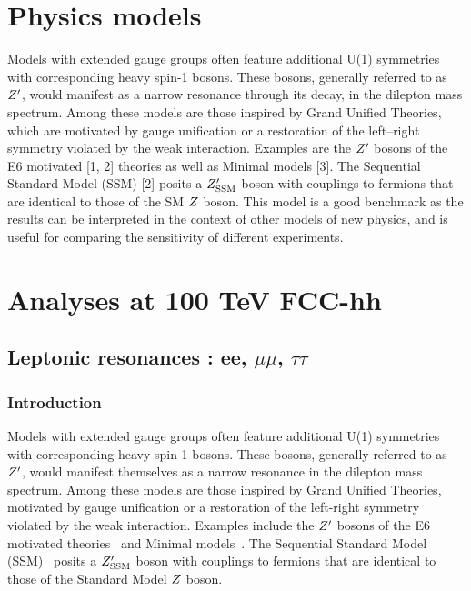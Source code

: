 \documentclass{cernrep}
\begin{document}
\section{Physics models}
\label{sec:physmodel}

Models with extended gauge groups often feature additional U(1) symmetries with corresponding heavy spin-1 bosons. These bosons, generally referred to as $Z^{\prime}$, would manifest as a narrow resonance through
its  decay,  in  the  dilepton  mass  spectrum.   
Among  these  models  are  those  inspired  by  Grand  Unified Theories, which are 
motivated by gauge unification or a restoration of the left–right symmetry violated
by the weak interaction. Examples are the $Z^{\prime}$
bosons of the E6 motivated [1, 2] theories as well as Minimal models [3].  
The Sequential Standard Model (SSM) [2] posits a $Z^{\prime}_{\mathrm{SSM}}$ boson with couplings to fermions
that are identical to those of the SM $Z$ boson. This model is a good benchmark as the 
results can be interpreted in the context of other models of new physics, and is useful 
for comparing the sensitivity of different experiments.



\section{Analyses at 100 TeV FCC-hh}
\label{sec:ana100tev}

\subsection{Leptonic resonances : ee, \texorpdfstring{$\mu\mu$}{uu}, \texorpdfstring{$\tau\tau$}{tt}}
\label{subsec:lepreso}

\subsubsection{Introduction}
Models with extended gauge groups often feature additional U(1) symmetries with corresponding heavy spin-1 bosons. These bosons, generally referred to as $Z^{\prime}$, would manifest themselves as a narrow resonance in the dilepton mass spectrum. Among these models are those inspired by Grand Unified Theories, motivated by gauge unification or a restoration of the left-right symmetry violated by the weak interaction. Examples include the $Z^{\prime}$ bosons of the E6 motivated theories~\cite{London:1986jz,Joglekar:2016yap,Langacker:2008yv} and Minimal models~\cite{Salvioni:2009mt}. The Sequential Standard Model (SSM)~\cite{Langacker:2008yv} posits a $Z^{\prime}_{\mathrm{SSM}}$ boson with couplings to fermions that are identical to those of the Standard Model $Z$ boson.
\end{document}
